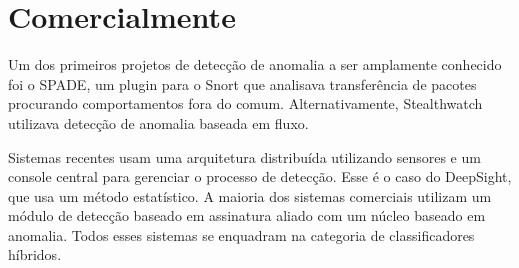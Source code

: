  \section{Comercialmente}
 Um dos primeiros projetos de detecção de anomalia a ser amplamente conhecido foi o SPADE, um plugin para o Snort que
 analisava transferência de pacotes procurando comportamentos fora do comum. Alternativamente, Stealthwatch utilizava
 detecção de anomalia baseada em fluxo.
 \par Sistemas recentes usam uma arquitetura distribuída utilizando sensores e um
 console central para gerenciar o processo de detecção. Esse é o caso do DeepSight, que usa um método estatístico.
 A maioria dos sistemas comerciais utilizam um módulo de detecção baseado em assinatura aliado com um núcleo baseado em
 anomalia. Todos esses sistemas se enquadram na categoria de classificadores híbridos.